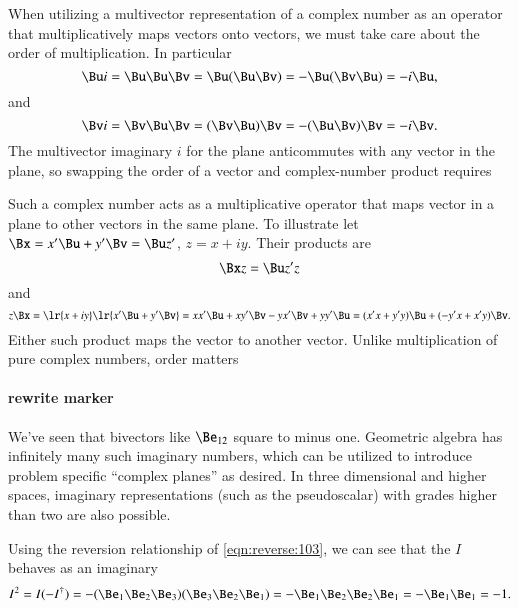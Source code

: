 When utilizing a multivector representation of a complex number as an operator that multiplicatively maps vectors onto vectors, we must take care about the order of multiplication.  In particular
\begin{dmath}\label{eqn:complex:3410}
\Bu i
= \Bu \Bu \Bv
= \Bu (\Bu \Bv)
= -\Bu (\Bv \Bu)
= -i \Bu,
\end{dmath}
and
\begin{dmath}\label{eqn:complex:3430}
\Bv i
= \Bv \Bu \Bv
= (\Bv \Bu) \Bv
= -(\Bu \Bv) \Bv
= -i \Bv.
\end{dmath}
The multivector imaginary \( i \) for the plane anticommutes with any vector in the plane, so swapping the order of a vector and complex-number product requires



Such a complex number acts as a multiplicative operator that maps vector in a plane to other vectors in the same plane.
To illustrate let \( \Bx = x' \Bu + y' \Bv = \Bu z' \), \( z = x + i y \).  Their products are
\begin{dmath}\label{eqn:complex:3370}
\Bx z
= \Bu z' z
\end{dmath}
and
\begin{dmath}\label{eqn:complex:3390}
z \Bx
=
\lr{ x + i y }
\lr{ x' \Bu + y' \Bv }
=
x x' \Bu + x y' \Bv
- y x' \Bv + y y' \Bu
=  (x' x + y' y) \Bu + ( - y' x + x' y ) \Bv.
\end{dmath}
Either such product maps the vector to another vector.  Unlike multiplication of pure complex numbers, order matters

\paragraph{rewrite marker}

We've seen that bivectors like \( \Be_{12} \) square to minus one.
Geometric algebra has infinitely many such imaginary numbers, which can be utilized to introduce problem specific ``complex planes'' as desired.
In three dimensional and higher spaces, imaginary representations
(such as the  pseudoscalar) with grades higher than two are also possible.

Using the reversion relationship of \cref{eqn:reverse:103}, we can see that the \( I \) behaves as an imaginary
\begin{dmath}\label{eqn:complex:3310}
I^2
=
I (-I^\dagger)
=
-
(\Be_1 \Be_2 \Be_3)(\Be_3 \Be_2 \Be_1)
=
-
\Be_1 \Be_2 \Be_2 \Be_1
=
-
\Be_1 \Be_1
=
-1.
\end{dmath}

